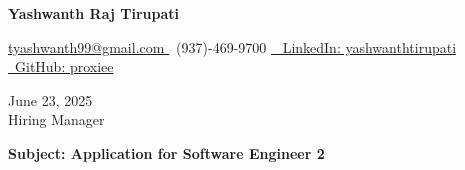 \documentclass[letterpaper,11pt]{article}
\begin{document}
\begin{center}
    \textbf{\LARGE Yashwanth Raj Tirupati}
    \vspace{4pt}
    
    \small
    \href{mailto:tyashwanth99@gmail.com}{ tyashwanth99@gmail.com }\textbar
     ~(937)-469-9700 \textbar
    \href{https://linkedin.com/in/yashwanthtirupati}{~ LinkedIn: yashwanthtirupati }\textbar 
    \href{https://github.com/proxiee}{~GitHub: proxiee }
\end{center}

\vspace{20pt}

\begin{flushleft}
    June 23, 2025 \\
    \vspace{12pt}
    Hiring Manager \\
\end{flushleft}


\begin{flushleft}
\textbf{Subject: Application for Software Engineer 2}
\end{flushleft}


\end{document}
